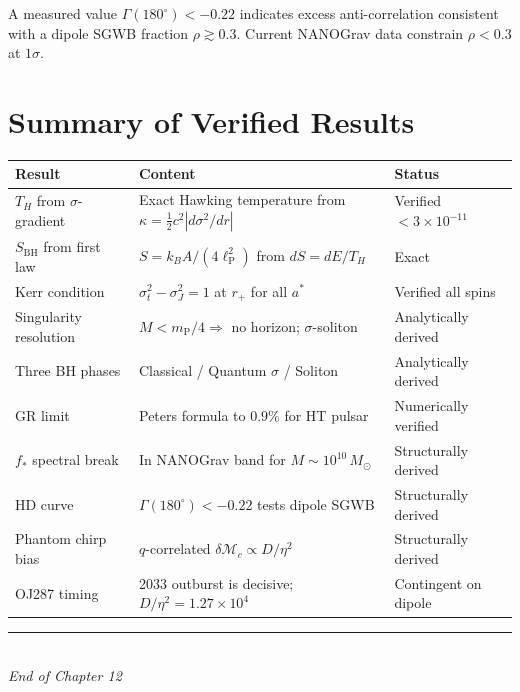 \documentclass[12pt,a4paper]{article}
\newcommand{\lP}{\ell_{\mathrm{P}}}
\newcommand{\mP}{m_{\mathrm{P}}}
\newcommand{\Msun}{M_{\odot}}
\begin{document}
\begin{prediction}
A measured value $\Gamma(180^{\circ})<-0.22$ indicates excess
anti-correlation consistent with a dipole SGWB fraction $\rho\gtrsim0.3$.
Current NANOGrav data constrain $\rho<0.3$ at $1\sigma$.
\end{prediction}

\section{Summary of Verified Results}

\begin{center}
\renewcommand{\arraystretch}{1.35}
\begin{tabular}{p{3.8cm}p{6.8cm}p{2.8cm}}
\toprule
Result & Content & Status\\
\midrule
$T_H$ from $\sigma$-gradient
  & Exact Hawking temperature from $\kappa=\frac{1}{2}c^2|d\sigma^2/dr|$
  & Verified $<3\times10^{-11}$\\[3pt]
$S_{\mathrm{BH}}$ from first law
  & $S=k_B A/(4\lP^2)$ from $dS=dE/T_H$
  & Exact\\[3pt]
Kerr condition
  & $\sigma_t^2-\sigma_J^2=1$ at $r_+$ for all $a^*$
  & Verified all spins\\[3pt]
Singularity resolution
  & $M<\mP/4 \Rightarrow$ no horizon; $\sigma$-soliton
  & Analytically derived\\[3pt]
Three BH phases
  & Classical / Quantum $\sigma$ / Soliton
  & Analytically derived\\[3pt]
GR limit
  & Peters formula to $0.9\%$ for HT pulsar
  & Numerically verified\\[3pt]
$f_*$ spectral break
  & In NANOGrav band for $M\sim10^{10}\,\Msun$
  & Structurally derived\\[3pt]
HD curve
  & $\Gamma(180^{\circ})<-0.22$ tests dipole SGWB
  & Structurally derived\\[3pt]
Phantom chirp bias
  & $q$-correlated $\delta\mathcal{M}_c\propto D/\eta^2$
  & Structurally derived\\[3pt]
OJ287 timing
  & 2033 outburst is decisive; $D/\eta^2=1.27\times10^4$
  & Contingent on dipole\\
\bottomrule
\end{tabular}
\end{center}

\bigskip
\begin{center}
\rule{0.5\textwidth}{0.4pt}\\[4pt]
\textit{End of Chapter 12}
\end{center}
\end{document}
